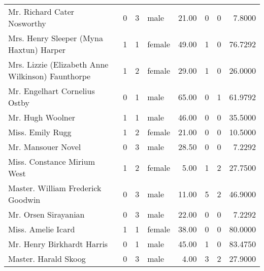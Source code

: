 \begin{tabular}{lrrlrrrr}
Mr. Richard Cater Nosworthy                        &         0 &       3 &    male &  21.00 &                        0 &                        0 &    7.8000 \\
Mrs. Henry Sleeper (Myna Haxtun) Harper            &         1 &       1 &  female &  49.00 &                        1 &                        0 &   76.7292 \\
Mrs. Lizzie (Elizabeth Anne Wilkinson) Faunthorpe  &         1 &       2 &  female &  29.00 &                        1 &                        0 &   26.0000 \\
Mr. Engelhart Cornelius Ostby                      &         0 &       1 &    male &  65.00 &                        0 &                        1 &   61.9792 \\
Mr. Hugh Woolner                                   &         1 &       1 &    male &  46.00 &                        0 &                        0 &   35.5000 \\
Miss. Emily Rugg                                   &         1 &       2 &  female &  21.00 &                        0 &                        0 &   10.5000 \\
Mr. Mansouer Novel                                 &         0 &       3 &    male &  28.50 &                        0 &                        0 &    7.2292 \\
Miss. Constance Mirium West                        &         1 &       2 &  female &   5.00 &                        1 &                        2 &   27.7500 \\
Master. William Frederick Goodwin                  &         0 &       3 &    male &  11.00 &                        5 &                        2 &   46.9000 \\
Mr. Orsen Sirayanian                               &         0 &       3 &    male &  22.00 &                        0 &                        0 &    7.2292 \\
Miss. Amelie Icard                                 &         1 &       1 &  female &  38.00 &                        0 &                        0 &   80.0000 \\
Mr. Henry Birkhardt Harris                         &         0 &       1 &    male &  45.00 &                        1 &                        0 &   83.4750 \\
Master. Harald Skoog                               &         0 &       3 &    male &   4.00 &                        3 &                        2 &   27.9000 \\

\end{tabular}
